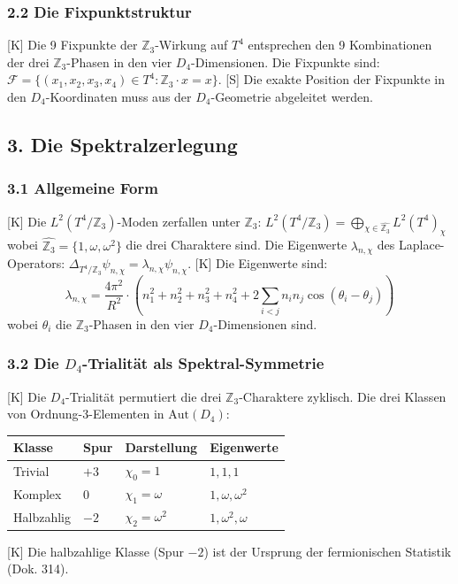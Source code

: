 \documentclass[11pt,a4paper]{article}
\begin{document}
	\subsubsection{2.2 Die Fixpunktstruktur}
	[K] Die 9 Fixpunkte der $\mathbb{Z}_3$-Wirkung auf $T^4$ entsprechen den 9 Kombinationen der drei $\mathbb{Z}_3$-Phasen in den vier $D_4$-Dimensionen.
	Die Fixpunkte sind: $\mathcal{F} = \{(x_1, x_2, x_3, x_4) \in T^4 : \mathbb{Z}_3 \cdot x = x\}$.
	[S] Die exakte Position der Fixpunkte in den $D_4$-Koordinaten muss aus der $D_4$-Geometrie abgeleitet werden.
	
	\subsection{3. Die Spektralzerlegung}
	\subsubsection{3.1 Allgemeine Form}
	[K] Die $L^2(T^4/\mathbb{Z}_3)$-Moden zerfallen unter $\mathbb{Z}_3$: $L^2(T^4/\mathbb{Z}_3) = \bigoplus_{\chi \in \widehat{\mathbb{Z}_3}} L^2(T^4)_\chi$ wobei $\widehat{\mathbb{Z}_3} = \{1, \omega, \omega^2\}$ die drei Charaktere sind.
	Die Eigenwerte $\lambda_{n,\chi}$ des Laplace-Operators: $\Delta_{T^4/\mathbb{Z}_3} \psi_{n,\chi} = \lambda_{n,\chi} \psi_{n,\chi}$.
	[K] Die Eigenwerte sind:
	\begin{equation}
		\lambda_{n,\chi} = \frac{4\pi^2}{R^2} \cdot \left(n_1^2 + n_2^2 + n_3^2 + n_4^2 + 2\sum_{i<j} n_i n_j \cos(\theta_i - \theta_j)\right)
	\end{equation}
	wobei $\theta_i$ die $\mathbb{Z}_3$-Phasen in den vier $D_4$-Dimensionen sind.
	
	\subsubsection{3.2 Die $D_4$-Trialität als Spektral-Symmetrie}
	[K] Die $D_4$-Trialität permutiert die drei $\mathbb{Z}_3$-Charaktere zyklisch. Die drei Klassen von Ordnung-3-Elementen in $\text{Aut}(D_4)$:
	\begin{longtable}{llll}
		\toprule
		\textbf{Klasse} & \textbf{Spur} & \textbf{Darstellung} & \textbf{Eigenwerte} \\
		\midrule
		\endhead
		\bottomrule
		\endfoot
		Trivial & $+3$ & $\chi_0 = 1$ & $1, 1, 1$ \\
		Komplex & $0$ & $\chi_1 = \omega$ & $1, \omega, \omega^2$ \\
		Halbzahlig & $-2$ & $\chi_2 = \omega^2$ & $1, \omega^2, \omega$ \\
	\end{longtable}
	[K] Die halbzahlige Klasse (Spur $-2$) ist der Ursprung der fermionischen Statistik (Dok. 314).
	
\end{document}

